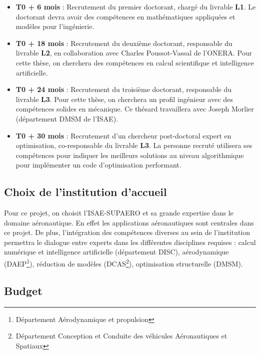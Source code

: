 \documentclass[12pt, french]{article}
\begin{document}
	\begin{itemize}
		\item \textbf{T0 + 6 mois} : Recrutement du premier doctorant, chargé du livrable \textbf{L1}. Le doctorant devra avoir des compétences en mathématiques appliquées et modèles pour l'ingénierie.
		\item \textbf{T0 + 18 mois} : Recrutement du deuxième doctorant, responsable du livrable \textbf{L2}, en collaboration avec Charles Poussot-Vassal de l'ONERA. Pour cette thèse, on cherchera des compétences en calcul scientifique et intelligence artificielle.
		\item \textbf{T0 + 24 mois} : Recrutement du troisième doctorant, responsable du livrable \textbf{L3}. Pour cette thèse, on cherchera un profil ingénieur avec des compétences solides en mécanique. Ce thésard travaillera avec Joseph Morlier (département DMSM de l'ISAE).
		\item \textbf{T0 + 30 mois} : Recrutement d'un chercheur post-doctoral expert en optimisation, co-responsable du livrable \textbf{L3}. La personne recruté utilisera ses compétences pour indiquer les meilleurs solutions au niveau algorithmique pour implémenter un code d'optimisation performant.
	\end{itemize}
	


	
	\subsection{Choix de l'institution d'accueil}
	Pour ce projet, on choisit l'ISAE-SUPAERO et sa grande expertise dans le domaine aéronautique. En effet les applications aéronautiques sont centrales dans ce projet. De plus, l'intégration des compétences diverses au sein de l'institution permettra le dialogue entre experts dans les différentes disciplines requises : calcul numérique et intelligence artificielle (département DISC), aérodynamique (DAEP\footnote{Département Aérodynamique et propulsion}), réduction de modèles (DCAS\footnote{Département Conception et Conduite des véhicules Aéronautiques et Spatiaux}), optimisation structurelle (DMSM).
	
	
	\subsection{Budget}
\end{document}
